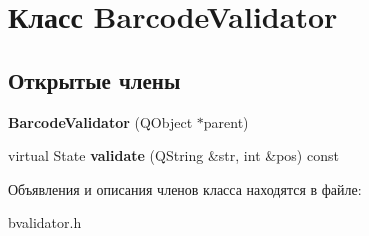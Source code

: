 \hypertarget{class_barcode_validator}{\section{Класс \-Barcode\-Validator}
\label{class_barcode_validator}
}
\subsection*{Открытые члены}
\begin{DoxyCompactItemize}
\item 
\hypertarget{class_barcode_validator_a82cba76cfd384e99f23cb7549be0e191}{{\bfseries \-Barcode\-Validator} (\-Q\-Object $\ast$parent)}\label{class_barcode_validator_a82cba76cfd384e99f23cb7549be0e191}

\item 
\hypertarget{class_barcode_validator_ada91b0d9248d4d629403e6540fe29e7b}{virtual \-State {\bfseries validate} (\-Q\-String \&str, int \&pos) const }\label{class_barcode_validator_ada91b0d9248d4d629403e6540fe29e7b}

\end{DoxyCompactItemize}


Объявления и описания членов класса находятся в файле\-:\begin{DoxyCompactItemize}
\item 
bvalidator.\-h\end{DoxyCompactItemize}
